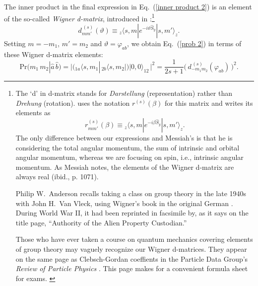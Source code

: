 The inner product in the final expression in Eq.\ (\ref{inner product 2}) is an element of the so-called \emph{Wigner d-matrix}, introduced in \citet[Ch.\ XV]{Wigner 1931}:\footnote{The `d' in d-matrix stands for \emph{Darstellung} (representation) rather than \emph{Drehung} (rotation). \citet[Vol.\ 2, p.\ 1070, Eq.\ C55]{Messiah 1962} uses the notation $r^{(s)}(\beta)$ for this matrix and writes its elements as
$$
r^{(s)}_{mm'}(\beta) \equiv {_{z\!}}\langle s, m | e^{\displaystyle -i \beta \hat{S}_y}   | s, m' \rangle_z.
$$
The only difference between our expressions and Messiah's is that he is considering the total angular momentum, the sum of intrinsic and orbital angular momentum, whereas we are focusing on spin, i.e., intrinsic angular momentum. As Messiah notes, the elements of the Wigner d-matrix are always real (ibid., p. 1071).

Philip W.\ Anderson recalls taking a class on group theory in the late 1940s with John H.\ Van Vleck, using Wigner's book in the original German \citep[p.\ 148]{Midwinter and Janssen 2013}. During World War II, it had been reprinted in facsimile by, as it says on the title page, ``Authority of the Alien Property Custodian.''

Those who have ever taken a course on quantum mechanics covering elements of group theory may vaguely recognize our Wigner d-matrices. They appear on the same page as  Clebsch-Gordan coeffients in the Particle Data Group's \emph{Review of Particle Physics} \citep[p. 564]{Tanabashi et al 2018}. This page makes for a convenient formula sheet for exams.
\label{Messiah}}
\begin{equation}
d^{\,(s)}_{mm'}(\vartheta) \equiv {_{z\!}}\langle s, m |e^{-i \vartheta \hat{S}_{y}}| s, m' \rangle_{z}.
\label{wigner}
\end{equation}
Setting $m = -m_1$, $m' = m_2$ and $\vartheta = \varphi_{ab}$, we  obtain Eq.\ (\ref{prob 2}) in terms of these Wigner d-matrix elements:
\begin{equation}
\mathrm{Pr}(m_1\, m_2 | \hat{a}\,\hat{b} ) = \Big| \Big( {_{1a\!}}\langle s, m_1| \, {_{2b\!}}\langle s, m_2 | \Big)| 0, 0\rangle_{\! 12}\, \Big|^{2\!} = \frac{1}{2s+1} \Big( \, d^{\,(s)}_{-m_1m_2}(\varphi_{ab}) \, \Big)^{2\!}.
\label{prob 3}
\end{equation} 

